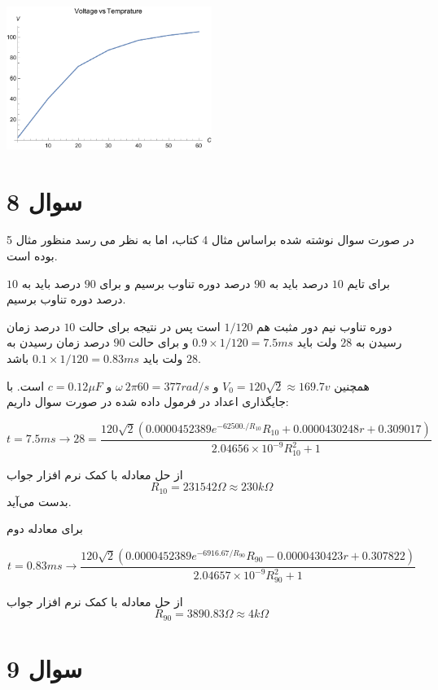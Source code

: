 \documentclass[12pt]{article}
\begin{document}
\begin{enumerate}
\begin{center}
	\includegraphics[width =0.5\textwidth]{images/2.pdf}
\end{center}


\end{enumerate}


\newpage
\section*{سوال 8}

در صورت سوال نوشته شده براساس مثال 4 کتاب، اما به نظر می رسد منظور مثال 5 بوده است.


برای تایم $10$ درصد باید به $90$ درصد دوره تناوب برسیم و برای $90$ درصد باید به $10$ درصد دوره تناوب برسیم.

دوره تناوب نیم دور مثبت هم $1/120$ است پس در نتیجه برای حالت $10$ درصد زمان رسیدن به $28$ ولت باید
$0.9 \times 1/120 = 7.5ms$
و برای حالت $90$ درصد زمان رسیدن به $28$ ولت باید
$0.1 \times 1/120 = 0.83ms$
باشد.

همچنین
$V_0 = 120\sqrt{2}\approx 169.7 v$
و
$\omega \ 2\pi 60 = 377 rad/s$
و
$c=0.12 \mu F$
است. با جایگذاری اعداد در فرمول داده شده در صورت سوال داریم:
  
  
 $$t=7.5 ms \rightarrow 28 = \frac{120 \sqrt{2} \left(0.0000452389 e^{-62500./R_{10}} R_{10}+0.0000430248 r+0.309017\right)}{{2.04656\times 10^{-9}} R_{10}^2+1}$$
 
 از حل معادله با کمک نرم افزار
 جواب
 $$R_{10} = 231542 \Omega \approx 230 k\Omega$$
 بدست می‌آید.
 
 برای معادله دوم 

$$t= 0.83 ms \rightarrow
\frac{120 \sqrt{2} \left(0.0000452389 e^{-6916.67/R_{90}} R_{90}-0.0000430423 r+0.307822\right)}{{2.04657\times 10^{-9} R_{90}^2+1}} $$

 
از حل معادله با کمک نرم افزار
جواب
$$R_{90} = 3890.83 \Omega \approx 4 k\Omega$$

 
 \newpage
 \section*{سوال 9}
 
\end{document}
